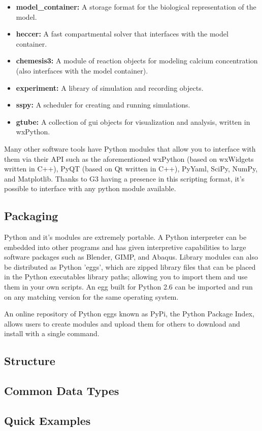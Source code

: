 \documentclass[12pt]{article}
\begin{document}
\begin{itemize}
\item[]  {\bf model\_container:} A storage format for the biological representation of the model.
\item[]{\bf heccer:} A fast compartmental solver that interfaces with the model container. 
\item[] {\bf chemesis3:} A module of reaction objects for modeling calcium concentration (also interfaces with the model container).
\item[] {\bf experiment:} A library of simulation and recording objects.
\item[] {\bf sspy:} A scheduler for creating and running simulations.
\item[] {\bf gtube:} A collection of gui objects for visualization and analysis, written in wxPython.
\end{itemize}

Many other software tools have Python modules that allow you to interface with them via their API such as the aforementioned wxPython (based on wxWidgets written in C++), PyQT (based on Qt written in C++), PyYaml, SciPy, NumPy, and Matplotlib. Thanks to G3 having a presence in this scripting format, it's possible to interface with any python module available. 


\subsection*{Packaging}

Python and it's modules are extremely portable. A Python interpreter can be embedded into other programs and has given interpretive capabilities to large software packages such as Blender, GIMP, and Abaqus. Library modules can also be distributed as Python 'eggs', which are zipped library files that can be placed in the Python executables library paths; allowing you to import them and use them in your own scripts. An egg built for Python 2.6 can be imported and run on any matching version for the same operating system. 

An online repository of Python eggs known as PyPi, the Python Package Index, allows users to create modules and upload them for others to download and install with a single command.


\subsection*{Structure}



\subsection*{Common Data Types}




\subsection*{Quick Examples}
\end{document}
